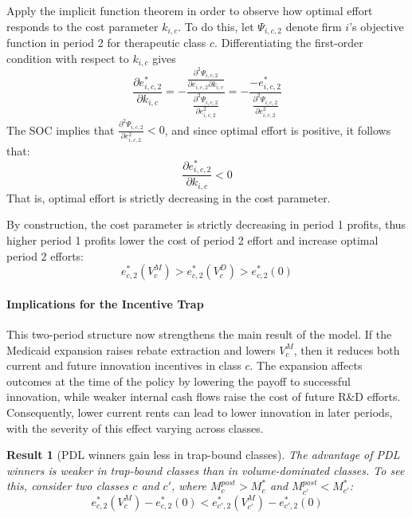 \documentclass[12pt]{article}
\newtheorem{result}{Result}
\begin{document}
Apply the implicit function theorem in order to observe how optimal effort responds to the cost parameter $k_{i,c}$. To do this, let $\Psi_{i,c,2}$ denote firm $i$'s objective function in period 2 for therapeutic class $c$. Differentiating the first-order condition with respect to $k_{i,c}$ gives
\begin{equation}
    \frac{\partial e_{i,c,2}^*}{\partial k_{i,c}} = - \frac{\frac{\partial^2 \Psi_{i,c,2}}{\partial e_{i,c,2} \partial k_{i,c}}}{\frac{\partial^2 \Psi_{i,c,2}}{\partial e_{i,c,2}^2}} = - \frac{-e_{i,c,2}^*}{\frac{\partial^2 \Psi_{i,c,2}}{\partial e_{i,c,2}^2}}
\end{equation}
The SOC implies that $\frac{\partial^2 \Psi_{i,c,2}}{\partial e_{i,c,2}^2} < 0$, and since optimal effort is positive, it follows that:
\begin{equation}
    \frac{\partial e_{i,c,2}^*}{\partial k_{i,c}} < 0
\end{equation}
That is, optimal effort is strictly decreasing in the cost parameter.

By construction, the cost parameter is strictly decreasing in period 1 profits, thus higher period 1 profits lower the cost of period 2 effort and increase optimal period 2 efforts:
\begin{equation} \label{eq:effort_ranking}
    e_{c,2}^*(V_c^M) > e_{c,2}^*(V_c^D) > e_{c,2}^*(0)
\end{equation}

\paragraph{Implications for the Incentive Trap}
This two-period structure now strengthens the main result of the model. If the Medicaid expansion raises rebate extraction and lowers $V_c^M$, then it reduces both current and future innovation incentives in class $c$. The expansion affects outcomes at the time of the policy by lowering the payoff to successful innovation, while weaker internal cash flows raise the cost of future R\&D efforts. Consequently, lower current rents can lead to lower innovation in later periods, with the severity of this effect varying across classes.

\begin{result}[PDL winners gain less in trap-bound classes] \label{res:dynamic}
The advantage of PDL winners is weaker in trap-bound classes than in volume-dominated classes. To see this, consider two classes $c$ and $c'$, where $M_c^{post} > M_c^*$ and $M_{c'}^{post} < M_{c'}^*$:
\[
e_{c,2}^*(V_c^M) - e_{c,2}^*(0) < e_{c',2}^*(V_{c'}^M) - e_{c',2}^*(0)
\]
\end{result}
\end{document}
